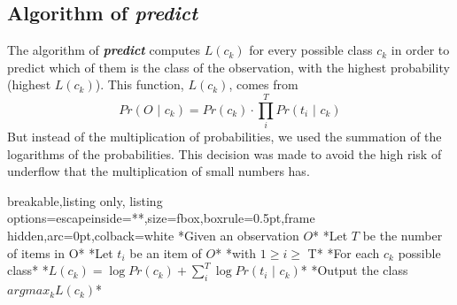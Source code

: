 \subsection{Algorithm of \textit{predict}}
The algorithm of \textbf{\textit{predict}} computes $L(c_k)$ for every possible class $c_k$ in order to predict which of them is the class of the observation, with the highest probability (highest $L(c_k)$). This function, $L(c_k)$, comes from
$$Pr(O\text{ | }c_k) = Pr(c_k)\cdot\prod_i^T{Pr(t_i\text{ | } c_k)}$$
But instead of the multiplication of probabilities, we used the summation of the logarithms of the probabilities. This decision was made to avoid the high risk of underflow that the multiplication of small numbers has.
\begin{tcblisting}{breakable,listing only,
    listing options={escapeinside={*}{*}},size=fbox,boxrule=0.5pt,frame hidden,arc=0pt,colback=white}
*Given an observation $O$*
    *Let $T$ be the number of items in O*
    *Let $t_i$ be an item of $O$*
        *with $1 \geq i \geq$ T*
    *For each $c_k$ possible class*
        *$L(c_k) = \log Pr(c_k)+\sum_i^T{\log Pr(t_i\text{ | } c_k)}$*
    *Output the class $argmax_k L(c_k)$*
\end{tcblisting}

